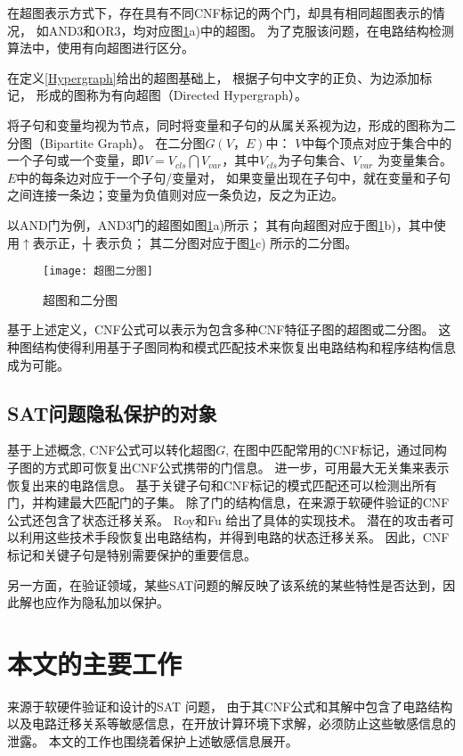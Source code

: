 在超图表示方式下，存在具有不同CNF标记的两个门，却具有相同超图表示的情况，
如AND3和OR3，均对应图\ref{graph}a)中的超图。
为了克服该问题，在电路结构检测算法中，使用有向超图进行区分。

\begin{definition}[有向超图]
在定义\ref{Hypergraph}给出的超图基础上，
根据子句中文字的正负、为边添加标记，
形成的图称为有向超图（Directed Hypergraph）。
\end{definition}

\begin{definition}[二分图]
将子句和变量均视为节点，同时将变量和子句的从属关系视为边，形成的图称为二分图（Bipartite Graph）。
在二分图$G(V，E)$中：
$V$中每个顶点对应于集合中的一个子句或一个变量，即$V=V_{cls}\bigcap V_{var}$，其中$V_{cls}$为子句集合、$V_{var}$ 为变量集合。
$E$中的每条边对应于一个子句/变量对，
如果变量出现在子句中，就在变量和子句之间连接一条边；变量为负值则对应一条负边，反之为正边。
\end{definition}

以AND门为例，AND3门的超图如图\ref{graph}a)所示；
其有向超图对应于图\ref{graph}b)，其中使用$\uparrow$表示正，┼ 表示负；
其二分图对应于图\ref{graph}c) 所示的二分图。
\begin{figure}[t]
  \centering
  \texttt{[image: 超图二分图]}
  \caption{超图和二分图}
  \label{graph}
\end{figure}

基于上述定义，CNF公式可以表示为包含多种CNF特征子图的超图或二分图。
这种图结构使得利用基于子图同构和模式匹配技术来恢复出电路结构和程序结构信息成为可能。

\subsection{SAT问题隐私保护的对象}
基于上述概念,
CNF公式可以转化超图$G$,
在图中匹配常用的CNF标记，通过同构子图的方式即可恢复出CNF公式携带的门信息。
进一步，可用最大无关集来表示恢复出来的电路信息。
基于关键子句和CNF标记的模式匹配还可以检测出所有门，并构建最大匹配门的子集。
除了门的结构信息，在来源于软硬件验证的CNF公式还包含了状态迁移关系。
Roy和Fu 给出了具体的实现技术。
潜在的攻击者可以利用这些技术手段恢复出电路结构，并得到电路的状态迁移关系。
因此，CNF标记和关键子句是特别需要保护的重要信息。

另一方面，在验证领域，某些SAT问题的解反映了该系统的某些特性是否达到，因此解也应作为隐私加以保护。

\section{本文的主要工作}
来源于软硬件验证和设计的SAT 问题，
由于其CNF公式和其解中包含了电路结构以及电路迁移关系等敏感信息，在开放计算环境下求解，必须防止这些敏感信息的泄露。
本文的工作也围绕着保护上述敏感信息展开。

